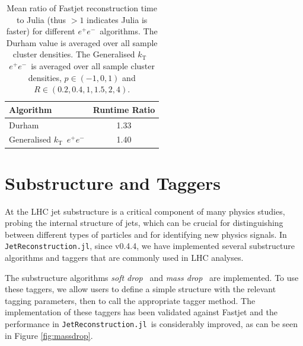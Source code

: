 \documentclass{webofc}
\newcommand{\kt}{${k}_\text{T}$}
\newcommand{\JR}{\texttt{JetReconstruction.jl}}
\newcommand{\ee}{$e^+e^-$}
\begin{document}
\begin{table}[ht]
    \begin{center}
        \begin{tabular}{l|c}
            \textbf{Algorithm} & \textbf{Runtime Ratio} \\
            \hline
            Durham & 1.33 \\
            Generalised \kt\ \ee & 1.40 \\
        \end{tabular}
        \caption{Mean ratio of Fastjet reconstruction time to Julia (thus $>1$ indicates Julia is faster) for different \ee\ algorithms. The Durham value is averaged over all sample cluster densities. The Generalised \kt\ \ee\ is averaged over all sample cluster densities, $p \in (-1, 0, 1)$ and $R \in (0.2, 0.4, 1, 1.5, 2, 4)$.}
        \label{tab:eeratios}
    \end{center}
\end{table}

\section{Substructure and Taggers}
\label{sec:sstag}

At the LHC jet substructure is a critical component of many physics studies,
probing the internal structure of jets, which can be crucial for distinguishing
between different types of particles and for identifying new physics signals. In
\JR, since v0.4.4, we have implemented several substructure algorithms and taggers that are
commonly used in LHC analyses.

The substructure algorithms \emph{soft
drop}~\cite{Larkoski_2014} and \emph{mass drop}~\cite{Butterworth_2008} are
implemented. To use these taggers, we allow users to define a simple structure
with the relevant tagging parameters, then to call the appropriate tagger
method. The implementation of these taggers has been validated against Fastjet
and the performance in \JR\ is considerably improved, as can be seen in Figure
\ref{fig:massdrop}.
\end{document}
